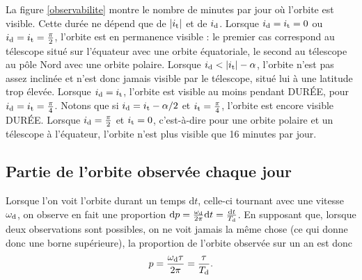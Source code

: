 La figure \ref{observabilite} montre le nombre de minutes par jour où l'orbite est visible. Cette durée ne dépend que de $|i_\text{t}|$ et de $i_\text{d}$. Lorsque $i_\text{d}=i_\text{t}=0$ ou $i_\text{d}=i_\text{t}=\frac{\pi}{2}$, l'orbite est en permanence visible : le premier cas correspond au télescope situé sur l'équateur avec une orbite équatoriale, le second au télescope au pôle Nord avec une orbite polaire. Lorsque $i_\text{d} < |i_\text{t}|-\alpha$, l'orbite n'est pas assez inclinée et n'est donc jamais visible par le télescope, situé lui à une latitude trop élevée. Lorsque $i_\text{d}=i_\text{t}$, l'orbite est visible au moins pendant {\Huge DURÉE}, pour $i_\text{d} = i_\text{t} = \frac{\pi}{4}$. Notons que si $i_\text{d} = i_\text{t} - \alpha/2$ et $i_\text{t} = \frac{\pi}{4}$, l'orbite est encore visible  {\Huge DURÉE}.
 Lorsque $i_\text{d} = \frac{\pi}{2}$ et $i_\text{t} = 0$, c'est-à-dire pour une orbite polaire et un télescope à l'équateur, l'orbite n'est plus visible que 16 minutes par jour. 


\subsection{Partie de l'orbite observée chaque jour}

Lorsque l'on voit l'orbite durant un temps $\mathrm{d}t$, celle-ci tournant avec une vitesse $\omega_\text{d}$, on observe en fait une proportion $\mathrm{d}p = \frac{\omega_\text{d}}{2\pi} \mathrm{d} t = \frac{\mathrm{d}t}{T_\text{d}}$. En supposant que, lorsque deux observations sont possibles, on ne voit jamais la même chose (ce qui donne donc une borne supérieure), la proportion de l'orbite observée sur un an est donc
\[ p = \frac{\omega_\text{d} \tau}{2\pi} = \frac{\tau}{T_\text{d}}.\]


